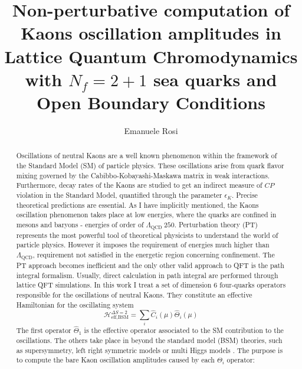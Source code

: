 \documentclass[english, LaM, oneside, noexaminfo]{sapthesis}
\title{Non-perturbative computation of Kaons oscillation amplitudes in Lattice Quantum Chromodynamics with $N_f = 2+1$ sea quarks and Open Boundary Conditions}
\author{Emanuele Rosi}
\newcommand{\mev}{\text{ MeV}}
\begin{document}
\frontmatter
\maketitle

\dedication{
    \hspace*{.76\textwidth}A mamma, a papà.
    \newline
    \newline
    \newline
    \newline
    A tutte quelle giornate in cui non mi stavo sacrificando per lo studio, stavo facendo ciò che amo.
}

\begin{abstract}
    Oscillations of neutral Kaons are a well known phenomenon within the framework of the Standard Model (SM) of particle physics.
    These oscillations arise from quark flavor mixing governed by the Cabibbo-Kobayashi-Maskawa matrix in weak interactions.
    Furthermore, decay rates of the Kaons are studied to get an indirect measure of $CP$ violation in the Standard Model, quantified through the parameter $\epsilon_K$.
    Precise theoretical predictions are essential.
    As I have implicitly mentioned, the Kaons oscillation phenomenon takes place at low energies, where the quarks are confined in mesons and baryons - energies of order of $\Lambda_\text{QCD} ~ 250$\mev \cite{WeinbergII}.
    Perturbation theory (PT) represents the most powerful tool of theoretical physicists to understand the world of particle physics.
    However it imposes the requirement of energies much higher than $\Lambda_\text{QCD}$, requirement not satisfied in the energetic region concerning confinement.
    The PT approach becomes inefficient and the only other valid approach to QFT is the path integral formalism.
    Usually, direct calculation in path integral are performed through lattice QFT simulations.
    \newline
    In this work I treat a set of dimension 6 four-quarks operators responsible for the oscillations of neutral Kaons.
    They constitute an effective Hamiltonian for the oscillating system
    $$ \mathcal{H}^{\Delta S=2}_\text{eff,BSM} = \sum_i \hat C_i (\mu) \hat\Theta_i (\mu) $$
    The first operator $\hat\Theta_1$ is the effective operator associated to the SM contribution to the oscillations.
    The others take place in beyond the standard model (BSM) theories, such as supersymmetry, left right symmetric models or multi Higgs models \cite{Bparameters}.
    The purpose is to compute the bare Kaon oscillation amplitudes caused by each $\Theta_i$ operator:

\end{abstract}
\end{document}
